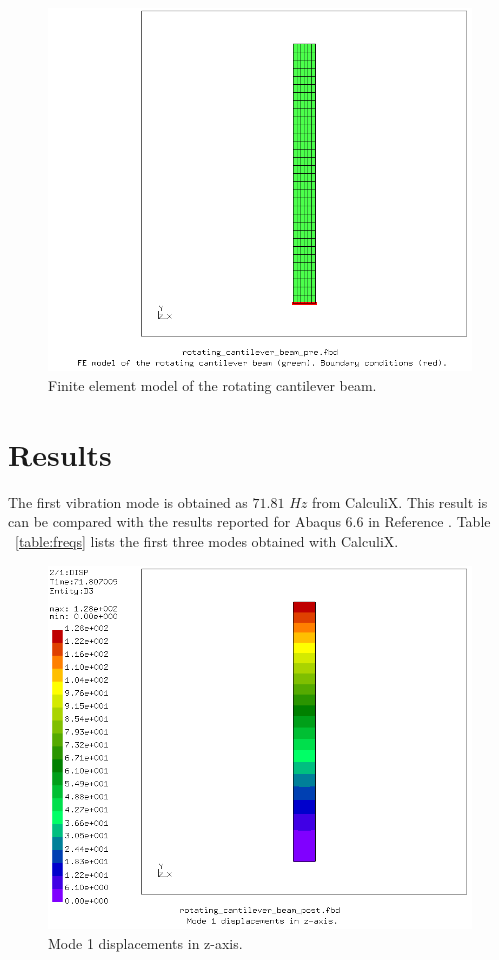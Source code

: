 \documentclass[12pt, a4paper, twoside]{article}
\begin{document}
\begin{figure}[h]
	\centering
	\includegraphics[scale=0.5]{pre}
	\caption{Finite element model of the rotating cantilever beam.}
	\label{fig:pre}
\end{figure}


\section{Results}

The first vibration mode is obtained as $71.81$ $Hz$ from CalculiX. This result is can be compared with the results reported for Abaqus 6.6 in Reference \cite{abaqus_manual}. Table ~\ref{table:freqs} lists the first three modes obtained with CalculiX.


\begin{figure}[h]
	\centering
	\includegraphics[scale=0.5]{post}
	\caption{Mode 1 displacements in z-axis.}
	\label{fig:post}
\end{figure}
\end{document}
